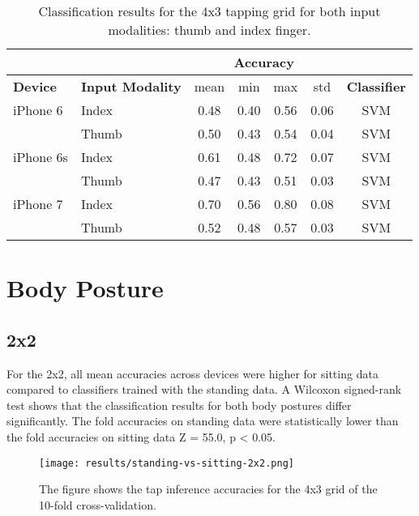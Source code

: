 \begin{appendix}
\begin{table}[h!]
  \centering
\begin{tabular}{|l|l|c|c|c|c|c|}
  \cline{3-6}
  \multicolumn{2}{c}{} & \multicolumn{4}{|c|}{\textbf{Accuracy}}  \\
  \hline
  \textbf{Device} & \textbf{Input Modality} & mean &   min &   max  & std &  \textbf{Classifier} \\
  \hline
	iPhone 6 & Index &      0.48 &     0.40 &     0.56 &     0.06 &  SVM \\
	& Thumb &      0.50 &     0.43 &     0.54 &     0.04 &  SVM \\
	\hline
iPhone 6s & Index &      0.61 &     0.48 &     0.72 &     0.07 &  SVM \\
	& Thumb &      0.47 &     0.43 &     0.51 &     0.03 &  SVM \\
	\hline
	iPhone 7 & Index &      0.70 &     0.56 &     0.80 &     0.08 &  SVM \\
	& Thumb &      0.52 &     0.48 &     0.57 &     0.03 &  SVM \\
	\hline
\end{tabular}
  \caption{Classification results for the 4x3 tapping grid for both input modalities: thumb and index finger.}
\end{table}

\section*{Body Posture}
\subsection*{2x2}
For the 2x2, all mean accuracies across devices were higher for sitting data compared to classifiers trained with the standing data. A Wilcoxon signed-rank test shows that the classification results for both body postures differ significantly. The fold accuracies on standing data were statistically lower than the fold accuracies on sitting data Z = 55.0, p < 0.05.

\begin{figure}[h!]
  \centering
  \texttt{[image: results/standing-vs-sitting-2x2.png]}
  \caption{The figure shows the tap inference accuracies for the 4x3 grid of the 10-fold cross-validation.} \label{fig:participation}
\end{figure}


\end{appendix}

